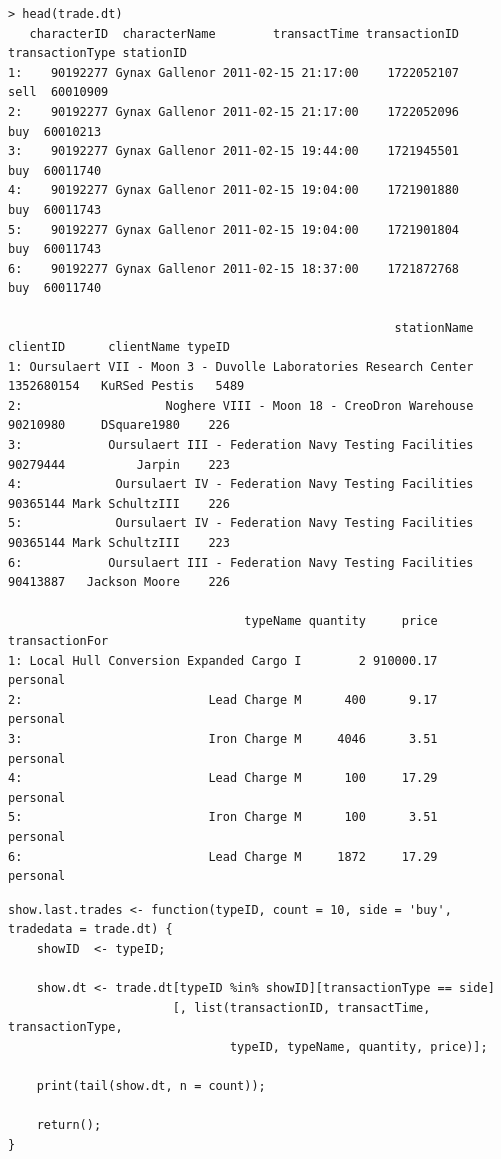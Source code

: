 \documentclass[12pt]{beamer}
\begin{document}
\begin{frame}[fragile]
\begin{verbatim}
> head(trade.dt)
   characterID  characterName        transactTime transactionID transactionType stationID
1:    90192277 Gynax Gallenor 2011-02-15 21:17:00    1722052107            sell  60010909
2:    90192277 Gynax Gallenor 2011-02-15 21:17:00    1722052096             buy  60010213
3:    90192277 Gynax Gallenor 2011-02-15 19:44:00    1721945501             buy  60011740
4:    90192277 Gynax Gallenor 2011-02-15 19:04:00    1721901880             buy  60011743
5:    90192277 Gynax Gallenor 2011-02-15 19:04:00    1721901804             buy  60011743
6:    90192277 Gynax Gallenor 2011-02-15 18:37:00    1721872768             buy  60011740

                                                      stationName   clientID      clientName typeID
1: Oursulaert VII - Moon 3 - Duvolle Laboratories Research Center 1352680154   KuRSed Pestis   5489
2:                    Noghere VIII - Moon 18 - CreoDron Warehouse   90210980     DSquare1980    226
3:            Oursulaert III - Federation Navy Testing Facilities   90279444          Jarpin    223
4:             Oursulaert IV - Federation Navy Testing Facilities   90365144 Mark SchultzIII    226
5:             Oursulaert IV - Federation Navy Testing Facilities   90365144 Mark SchultzIII    223
6:            Oursulaert III - Federation Navy Testing Facilities   90413887   Jackson Moore    226

                                 typeName quantity     price transactionFor
1: Local Hull Conversion Expanded Cargo I        2 910000.17       personal
2:                          Lead Charge M      400      9.17       personal
3:                          Iron Charge M     4046      3.51       personal
4:                          Lead Charge M      100     17.29       personal
5:                          Iron Charge M      100      3.51       personal
6:                          Lead Charge M     1872     17.29       personal
\end{verbatim}
\end{frame}


\begin{frame}[fragile]

\begin{verbatim}
show.last.trades <- function(typeID, count = 10, side = 'buy', tradedata = trade.dt) {
    showID  <- typeID;

    show.dt <- trade.dt[typeID %in% showID][transactionType == side]
                       [, list(transactionID, transactTime, transactionType,
                               typeID, typeName, quantity, price)];

    print(tail(show.dt, n = count));

    return();
}
\end{verbatim}
\end{frame}
\end{document}
